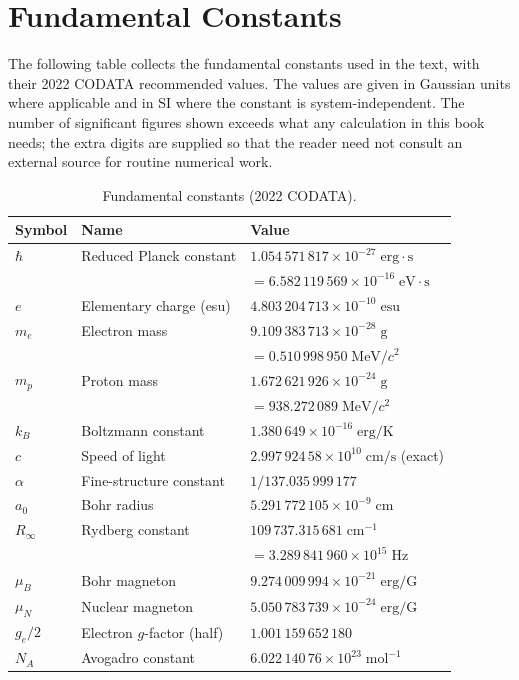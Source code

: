 \section{Fundamental Constants}
\label{sec:constants}

The following table collects the fundamental constants used in the text, with their 2022 CODATA recommended values. The values are given in Gaussian units where applicable and in SI where the constant is system-independent. The number of significant figures shown exceeds what any calculation in this book needs; the extra digits are supplied so that the reader need not consult an external source for routine numerical work.

\begin{table}[h]
    \centering
    \caption{Fundamental constants (2022 CODATA).}
    \label{tab:constants}
    \renewcommand{\arraystretch}{1.3}
    \begin{tabular}{l l l}
        \hline
        Symbol & Name & Value \\
        \hline
        $\hbar$ & Reduced Planck constant & $1.054\,571\,817 \times 10^{-27}\;\mathrm{erg{\cdot}s}$ \\
        && $= 6.582\,119\,569 \times 10^{-16}\;\mathrm{eV{\cdot}s}$ \\
        $e$ & Elementary charge (esu) & $4.803\,204\,713 \times 10^{-10}\;\mathrm{esu}$ \\
        $m_e$ & Electron mass & $9.109\,383\,713 \times 10^{-28}\;\mathrm{g}$ \\
        && $= 0.510\,998\,950\;\mathrm{MeV}/c^2$ \\
        $m_p$ & Proton mass & $1.672\,621\,926 \times 10^{-24}\;\mathrm{g}$ \\
        && $= 938.272\,089\;\mathrm{MeV}/c^2$ \\
        $k_B$ & Boltzmann constant & $1.380\,649 \times 10^{-16}\;\mathrm{erg/K}$ \\
        $c$ & Speed of light & $2.997\,924\,58 \times 10^{10}\;\mathrm{cm/s}$ (exact) \\
        $\alpha$ & Fine-structure constant & $1/137.035\,999\,177$ \\
        $a_0$ & Bohr radius & $5.291\,772\,105 \times 10^{-9}\;\mathrm{cm}$ \\
        $R_\infty$ & Rydberg constant & $109\,737.315\,681\;\mathrm{cm}^{-1}$ \\
        && $= 3.289\,841\,960 \times 10^{15}\;\mathrm{Hz}$ \\
        $\mu_B$ & Bohr magneton & $9.274\,009\,994 \times 10^{-21}\;\mathrm{erg/G}$ \\
        $\mu_N$ & Nuclear magneton & $5.050\,783\,739 \times 10^{-24}\;\mathrm{erg/G}$ \\
        $g_e/2$ & Electron $g$-factor (half) & $1.001\,159\,652\,180$ \\
        $N_A$ & Avogadro constant & $6.022\,140\,76 \times 10^{23}\;\mathrm{mol}^{-1}$ \\
        \hline
    \end{tabular}
\end{table}

